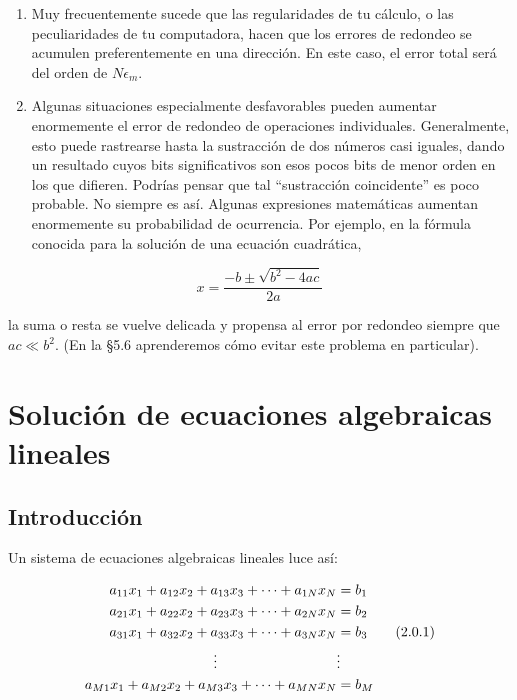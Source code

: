 \documentclass[10pt,a4paper]{book}
\begin{document}
\begin{enumerate}
  \item Muy frecuentemente sucede que las regularidades de tu cálculo, o las peculiaridades de tu computadora, hacen que los errores de redondeo se acumulen preferentemente en una dirección. En este caso, el error total será del orden de \( N \epsilon_m \).
  \item Algunas situaciones especialmente desfavorables pueden aumentar enormemente el error de redondeo de operaciones individuales. Generalmente, esto puede rastrearse hasta la sustracción de dos números casi iguales, dando un resultado cuyos bits significativos son esos pocos bits de menor orden en los que difieren. Podrías pensar que tal “sustracción coincidente” es poco probable. No siempre es así. Algunas expresiones matemáticas aumentan enormemente su probabilidad de ocurrencia. Por ejemplo, en la fórmula conocida para la solución de una ecuación cuadrática,
\end{enumerate}

\[
x = \frac{-b \pm \sqrt{b^2 - 4ac}}{2a} \tag{1.3.2}
\]

la suma o resta se vuelve delicada y propensa al error por redondeo siempre que \( ac \ll b^2 \). (En la \S5.6 aprenderemos cómo evitar este problema en particular).

\newpage

\chapter{Solución de ecuaciones algebraicas lineales}

\section{Introducción}

Un sistema de ecuaciones algebraicas lineales luce así:

\begin{align}
  a_{11}x_1 + a_{12}x_2 + a_{13}x_3 + \cdots + a_{1N}x_N &= b_1 \notag \\
  a_{21}x_1 + a_{22}x_2 + a_{23}x_3 + \cdots + a_{2N}x_N &= b_2 \notag \\
  a_{31}x_1 + a_{32}x_2 + a_{33}x_3 + \cdots + a_{3N}x_N &= b_3 \tag{2.0.1} \\
  \vdots \hspace{3cm} & \vdots \notag \\
  a_{M1}x_1 + a_{M2}x_2 + a_{M3}x_3 + \cdots + a_{MN}x_N &= b_M \notag
\end{align}
\end{document}
